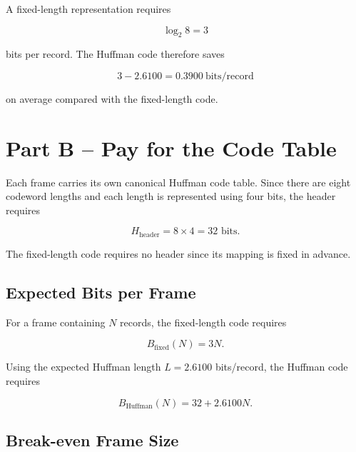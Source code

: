 \documentclass[11pt,a4paper]{article}
\begin{document}
A fixed-length representation requires

\[
\log_2 8 = 3
\]

bits per record. The Huffman code therefore saves

\begin{equation}
    3 - 2.6100 = \boxed{0.3900\ \text{bits/record}}
\end{equation}

on average compared with the fixed-length code.


\section{Part B -- Pay for the Code Table}

Each frame carries its own canonical Huffman code table. Since there
are eight codeword lengths and each length is represented using four
bits, the header requires

\begin{equation}
    H_{\mathrm{header}} = 8 \times 4 = 32\text{ bits}.
\end{equation}

The fixed-length code requires no header since its mapping is fixed in
advance.

\subsection{Expected Bits per Frame}

For a frame containing \(N\) records, the fixed-length code requires

\begin{equation}
    B_{\mathrm{fixed}}(N) = 3N.
\end{equation}

Using the expected Huffman length \(L=2.6100\) bits/record, the Huffman
code requires

\begin{equation}
    B_{\mathrm{Huffman}}(N)
    = 32 + 2.6100N.
\end{equation}

\subsection{Break-even Frame Size}
\end{document}
